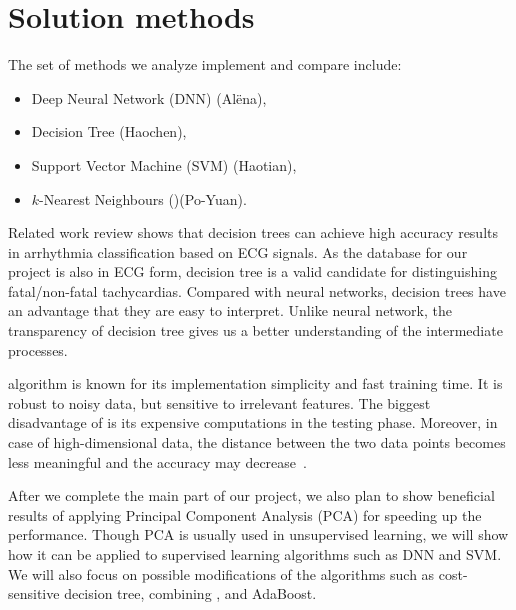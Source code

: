 \section{Solution methods}
\label{sec:methods}

The set of methods we analyze implement and compare include: 
\begin{itemize}
	\item Deep Neural Network (DNN) (Al\"ena),
	\item Decision Tree (Haochen),
	\item Support Vector Machine (SVM) (Haotian),
	\item $k$-Nearest Neighbours (\knn{})(Po-Yuan).	
\end{itemize}

Related work review shows that decision trees can achieve high 
accuracy results in arrhythmia classification based on ECG signals. 
As the database for our project is also in ECG form, decision tree is 
a valid candidate for distinguishing fatal/non-fatal tachycardias. 
Compared with neural networks, decision trees have an advantage that 
they are easy to interpret. 
Unlike neural network, the transparency of decision tree gives us a 
better understanding of the intermediate processes.
 
\knn{} algorithm is known for its implementation simplicity and fast 
training time. 
It is robust to noisy data, but sensitive to 
irrelevant features. 
The biggest disadvantage of \knn{} is its expensive computations in 
the testing phase. 
Moreover, in case of high-dimensional data, the distance between the 
two data points becomes less meaningful and the accuracy may 
decrease~\cite{beyer1999nearest}. 


After we complete the main part of our project,
we also plan to show  beneficial results of applying Principal 
Component 
Analysis (PCA) for speeding up the performance. Though PCA is 
usually used in unsupervised learning, we will show how it can be 
applied to supervised learning algorithms such as DNN and SVM.  
We will also focus on possible modifications of the algorithms such 
as cost-sensitive decision tree, combining \knn{}, and
AdaBoost. 
